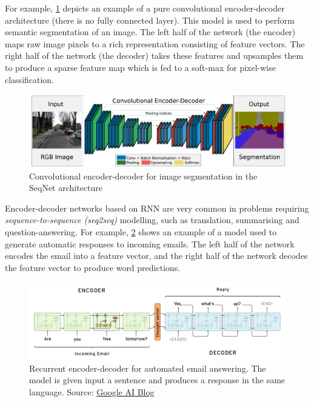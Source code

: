 For example, \cref{fig:cnn-cnn} depicts an example of a pure convolutional encoder-decoder architecture (there is no fully connected layer). This model is used to perform semantic segmentation of an image. The left half of the network (the encoder) maps raw image pixels to a rich representation consisting of feature vectors. The right half of the network (the decoder) takes these features and upsamples them to produce a sparse feature map which is fed to a soft-max for pixel-wise classification.

\begin{figure}[hpt]
	\centering
	\includegraphics[scale=0.45]{images/ch3/cnn-cnn.png}
	\caption{Convolutional encoder-decoder for image segmentation in the SeqNet architecture \citep{Badrinarayanan2017}}
	\label{fig:cnn-cnn}
\end{figure}

Encoder-decoder networks based on RNN are very common in problems requiring \textit{sequence-to-sequence (seq2seq)} modelling, such as translation, summarising and question-answering. For example, \cref{fig:rnn-rnn} shows an example of a model used to generate automatic responses to incoming emails. The left half of the network encodes the email into a feature vector, and the right half of the network decodes the feature vector to produce word predictions. 

\begin{figure}[hpt]
	\centering
	\includegraphics[scale=0.3]{images/ch3/rnn-rnn.png}
	\caption{Recurrent encoder-decoder for automated email answering. The model is given input a sentence and produces a response in the same language. Source: \href{https://ai.googleblog.com/2015/11/computer-respond-to-this-email.html}{Google AI Blog}}
	\label{fig:rnn-rnn}
\end{figure}

